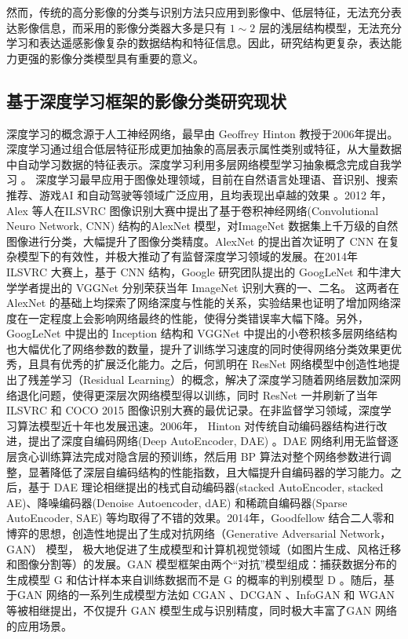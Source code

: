 然而，传统的高分影像的分类与识别方法只应用到影像中、低层特征，无法充分表达影像信息，而采用的影像分类器大多是只有 $1\sim2$ 层的浅层结构模型，无法充分学习和表达遥感影像复杂的数据结构和特征信息。因此，研究结构更复杂，表达能力更强的影像分类模型具有重要的意义。

\subsection{基于深度学习框架的影像分类研究现状}
\label{subsec:1-2-2}
深度学习的概念源于人工神经网络，最早由 Geoffrey Hinton \cite{hinton2006fast} 教授于2006年提出。深度学习通过组合低层特征形成更加抽象的高层表示属性类别或特征，从大量数据中自动学习数据的特征表示。深度学习利用多层网络模型学习抽象概念完成自我学习 \cite{lecun2015deep}。 深度学习最早应用于图像处理领域，目前在自然语言处理语、音识别、搜索推荐、游戏AI 和自动驾驶等领域广泛应用，且均表现出卓越的效果 \cite{bengio2009learning}。2012 年，Alex 等人在ILSVRC 图像识别大赛中提出了基于卷积神经网络(Convolutional Neuro Network, CNN) 结构的AlexNet \cite{NIPS2012_4824} 模型，对ImageNet 数据集上千万级的自然图像进行分类，大幅提升了图像分类精度。AlexNet 的提出首次证明了 CNN 在复杂模型下的有效性，并极大推动了有监督深度学习领域的发展。在2014年 ILSVRC 大赛上，基于 CNN 结构，Google 研究团队提出的 GoogLeNet \cite{szegedy2015going} 和牛津大学学者提出的 VGGNet \cite{simonyan2014very} 分别荣获当年 ImageNet 识别大赛的一、二名。 这两者在 AlexNet 的基础上均探索了网络深度与性能的关系，实验结果也证明了增加网络深度在一定程度上会影响网络最终的性能，使得分类错误率大幅下降。另外，GoogLeNet 中提出的 Inception 结构和 VGGNet 中提出的小卷积核多层网络结构也大幅优化了网络参数的数量，提升了训练学习速度的同时使得网络分类效果更优秀，且具有优秀的扩展泛化能力。之后，何凯明在 ResNet \cite{he2016deep} 网络模型中创造性地提出了残差学习（Residual Learning）的概念，解决了深度学习随着网络层数加深网络退化问题，使得更深层次网络模型得以训练，同时 ResNet 一并刷新了当年 ILSVRC 和 COCO 2015 图像识别大赛的最优记录。在非监督学习领域，深度学习算法模型近十年也发展迅速。2006年， Hinton 对传统自动编码器结构进行改进，提出了深度自编码网络(Deep AutoEncoder, DAE) \cite{hinton2006fast}。DAE 网络利用无监督逐层贪心训练算法完成对隐含层的预训练，然后用 BP 算法对整个网络参数进行调整，显著降低了深层自编码结构的性能指数，且大幅提升自编码器的学习能力。之后，基于 DAE 理论相继提出的栈式自动编码器(stacked AutoEncoder, stacked AE)\cite{bengio2007greedy}、降噪编码器(Denoise Autoencoder, dAE)\cite{vincent2008extracting} 和稀疏自编码器(Sparse AutoEncoder, SAE)\cite{ng2011sparse} 等均取得了不错的效果。2014年，Goodfellow 结合二人零和博弈的思想，创造性地提出了生成对抗网络（Generative Adversarial Network，GAN）\cite{goodfellow2014generative} 模型， 极大地促进了生成模型和计算机视觉领域（如图片生成、风格迁移和图像分割等）的发展。GAN 模型框架由两个“对抗”模型组成：捕获数据分布的生成模型 G 和估计样本来自训练数据而不是 G 的概率的判别模型 D 。随后，基于GAN 网络的一系列生成模型方法如 CGAN\cite{mirza2014conditional} 、DCGAN \cite{radford2015unsupervised} 、InfoGAN \cite{chen2016infogan} 和 WGAN \cite{arjovsky2017wasserstein} 等被相继提出，不仅提升 GAN 模型生成与识别精度，同时极大丰富了GAN 网络的应用场景。

